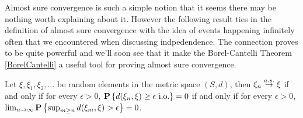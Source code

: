 Almost sure convergence is such a simple notion that it seems there
may be nothing worth explaining about it.  However the following
result ties in the definition of almost sure convergence with the
idea of events happening infinitely often that we encountered when
discussing indpedendence.  The connection proves to be quite powerful
and we'll soon see that it make the Borel-Cantelli Theorem \ref{BorelCantelli} a useful tool
for proving almost sure convergence.
\begin{lem}\label{ConvergenceAlmostSureByInfinitelyOften}Let $\xi, \xi_1, \xi_2, \dots$ be random elements in the
  metric space $(S,d)$, then $\xi_n \overset{a.s.}\to \xi$ if
and only if for every $\epsilon > 0$, $\textbf{P}\left \{d(\xi_n, \xi) \geq
  \epsilon \text{ i.o.} \right \}=0$ if and only if for every $\epsilon > 0$,
$\lim_{n \to \infty} \textbf{P}\left \{\sup_{m \geq n} d(\xi_m, \xi) > \epsilon \right \}
= 0$.  
\end{lem}
